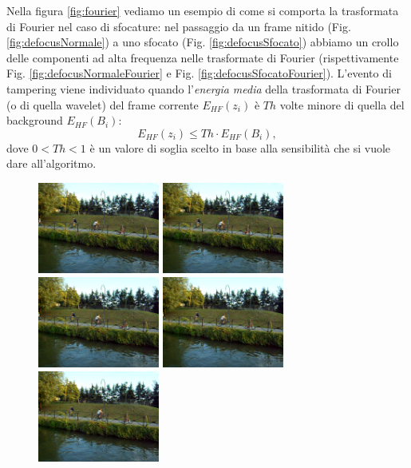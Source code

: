 Nella figura \ref{fig:fourier} vediamo un esempio di come si comporta la trasformata di Fourier nel caso di sfocature: 
nel passaggio da un frame nitido (Fig. \ref{fig:defocusNormale}) a uno sfocato (Fig. \ref{fig:defocusSfocato}) abbiamo un crollo delle componenti ad alta frequenza nelle trasformate di Fourier (rispettivamente Fig. \ref{fig:defocusNormaleFourier} e Fig. \ref{fig:defocusSfocatoFourier}).
L'evento di tampering viene individuato quando l'\textit{energia media} della trasformata di Fourier (o di quella wavelet) del frame corrente $E_{HF}(z_i)$ \`e $Th$ volte minore di quella del background $E_{HF}(B_i)$:
\[E_{HF}(z_i)\leq Th \cdot E_{HF}(B_i),\]
dove $0<Th<1$ \`e  un valore di soglia scelto in base alla sensibilit\`a che si vuole dare all'algoritmo.\\
\begin{figure}
	\centering
	\includegraphics[width = 4cm]{./pictures/FPSalto/img0001}
	\includegraphics[width = 4cm]{./pictures/FPSalto/img0002}
	\includegraphics[width = 4cm]{./pictures/FPSalto/img0003}
	\includegraphics[width = 4cm]{./pictures/FPSalto/img0004}
	\includegraphics[width = 4cm]{./pictures/FPSalto/img0005}

\end{figure}
